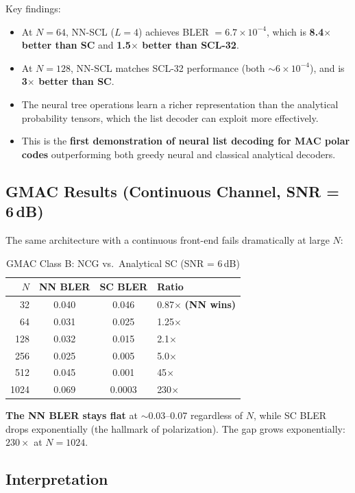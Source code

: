 \documentclass[10pt]{article}
\begin{document}
Key findings:
\begin{itemize}[nosep]
    \item At $N = 64$, NN-SCL ($L\!=\!4$) achieves BLER $= 6.7 \times 10^{-4}$, which is \textbf{8.4$\times$ better than SC} and \textbf{1.5$\times$ better than SCL-32}.
    \item At $N = 128$, NN-SCL matches SCL-32 performance (both $\sim 6 \times 10^{-4}$), and is \textbf{3$\times$ better than SC}.
    \item The neural tree operations learn a richer representation than the analytical probability tensors, which the list decoder can exploit more effectively.
    \item This is the \textbf{first demonstration of neural list decoding for MAC polar codes} outperforming both greedy neural and classical analytical decoders.
\end{itemize}

\subsection{GMAC Results (Continuous Channel, SNR = 6\,dB)}

The same architecture with a continuous front-end fails dramatically at large $N$:

\begin{table}[H]
\centering
\caption{GMAC Class B: NCG vs.\ Analytical SC (SNR = 6\,dB)}
\label{tab:gmac}
\begin{tabular}{@{}rccl@{}}
\toprule
$N$ & NN BLER & SC BLER & Ratio \\
\midrule
32   & 0.040  & 0.046  & 0.87$\times$ \textbf{(NN wins)} \\
64   & 0.031  & 0.025  & 1.25$\times$ \\
128  & 0.032  & 0.015  & 2.1$\times$ \\
256  & 0.025  & 0.005  & 5.0$\times$ \\
512  & 0.045  & 0.001  & 45$\times$ \\
1024 & 0.069  & 0.0003 & 230$\times$ \\
\bottomrule
\end{tabular}
\end{table}

\textbf{The NN BLER stays flat} at $\sim$0.03--0.07 regardless of $N$, while SC BLER drops exponentially (the hallmark of polarization). The gap grows exponentially: $230\times$ at $N = 1024$.

\subsection{Interpretation}
\end{document}

